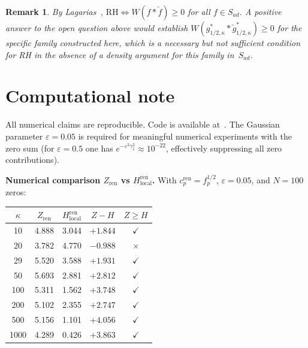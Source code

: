 \documentclass[11pt]{article}
\newtheorem*{remark*}{Remark}
\begin{document}
\begin{remark*}
By Lagarias~\cite{lagarias},
$\mathrm{RH} \iff W(f*\check f)\ge 0$ for all $f\in S_{ad}$.
A positive answer to the open question above would establish
$W(g^*_{1/2,\kappa}*\check g^*_{1/2,\kappa})\ge 0$ for the specific
family constructed here, which is a necessary but not sufficient
condition for RH in the absence of a density argument for this
family in~$S_{ad}$.
\end{remark*}

\section*{Computational note}

All numerical claims are reproducible. Code is available at~\cite{github}.
The Gaussian parameter $\varepsilon = 0.05$ is required for meaningful
numerical experiments with the zero sum (for $\varepsilon = 0.5$ one has
$e^{-\varepsilon^2\gamma_1^2} \approx 10^{-22}$, effectively
suppressing all zero contributions).

\medskip
\textbf{Numerical comparison $Z_{\mathrm{ren}}$ vs $H_{\mathrm{local}}^{\mathrm{ren}}$.}
With $c_p^{\mathrm{ren}} = f_p^{1/2}$, $\varepsilon=0.05$, and $N=100$ zeros:

\begin{center}
\begin{tabular}{ccccc}
\toprule
$\kappa$ & $Z_{\mathrm{ren}}$ & $H_{\mathrm{local}}^{\mathrm{ren}}$
         & $Z - H$ & $Z \ge H$ \\
\midrule
10   & 4.888 & 3.044 & $+1.844$ & $\checkmark$ \\
20   & 3.782 & 4.770 & $-0.988$ & $\times$ \\
29   & 5.520 & 3.588 & $+1.931$ & $\checkmark$ \\
50   & 5.693 & 2.881 & $+2.812$ & $\checkmark$ \\
100  & 5.311 & 1.562 & $+3.748$ & $\checkmark$ \\
200  & 5.102 & 2.355 & $+2.747$ & $\checkmark$ \\
500  & 5.156 & 1.101 & $+4.056$ & $\checkmark$ \\
1000 & 4.289 & 0.426 & $+3.863$ & $\checkmark$ \\
\bottomrule
\end{tabular}
\end{center}
\end{document}
